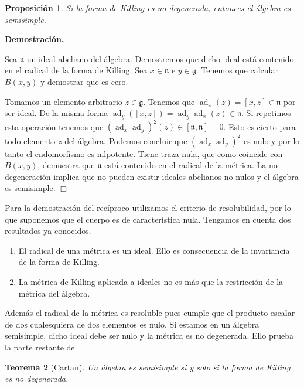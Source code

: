 \documentclass[a4paper,draft,12pt]{scrartcl}
\newtheorem{teo}{Teorema}[section]%
\newtheorem{propo}[teo]{Proposición}%
\newcommand{\dem}{\noindent \textbf{Demostración. }\vspace{0.3 cm}}%
\newcommand{\g}{\mathfrak{g}}%
\newcommand{\fin}{ $\Box $ \vspace{0.4 cm}}
\DeclareMathOperator{\ad}{ad}  %
\begin{document}
\begin{propo}

Si la forma de Killing es no degenerada, entonces el álgebra es semisimple.

\end{propo}

\dem

Sea $\mathfrak{n}$ un ideal abeliano del álgebra.  Demostremos que dicho ideal está contenido en el radical de la forma de Killing. Sea $x \in \mathfrak{n}$ e $y\in \g$.  Tenemos que calcular $B(x,y)$ y demostrar que es cero.

Tomamos un elemento arbitrario $z \in \g$.
Tenemos que $\ad_x(z)= [x,z]\in \mathfrak{n}$ por ser ideal.  De la misma forma $\ad_y([x,z]) = \ad_y\ad_x(z) \in \mathfrak{n}$.  Si repetimos esta operación tenemos que $(\ad_x\ad_y)^2(z) \in [\mathfrak{n},\mathfrak{n}]=0$.  Esto es cierto para todo elemento  $z$ del álgebra.  Podemos concluir que $(\ad_x\ad_y)^2$ es nulo y por lo tanto el endomorfismo es nilpotente.  Tiene traza nula, que como coincide con $B(x,y)$, demuestra que $\mathfrak{n}$ está contenido en el radical de la métrica.  La no degeneración implica que no pueden existir ideales abelianos no nulos y el álgebra es semisimple. \fin

Para la demostración del recíproco utilizamos el criterio de resolubilidad, por lo que suponemos que el cuerpo es de característica nula.  Tengamos en cuenta dos resultados ya conocidos.

\begin{enumerate}[\indent 1.- ]

\item El radical de una métrica es un ideal.  Ello es consecuencia de la invariancia de la forma de Killing.

\item La métrica de Killing aplicada a ideales no es más que la restricción de la métrica del álgebra.

\end{enumerate}

  Además el radical de la métrica  es resoluble pues cumple que el producto escalar de dos cualesquiera de dos elementos es nulo.    Si estamos en un álgebra semisimple, dicho ideal debe ser nulo y la métrica es no degenerada.  Ello prueba la parte restante del 

\begin{teo}[Cartan]

Un álgebra es semisimple si y solo si la forma de Killing es no degenerada.

\end{teo}
\end{document}

